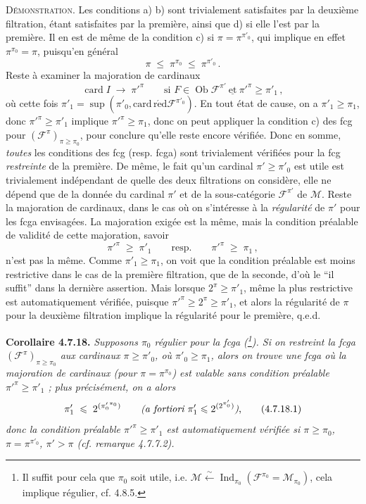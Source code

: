 \documentclass[11pt]{article}
\newcommand{\printedpage}[1]{\marginpar{\footnotesize p.~#1}}
\newcommand{\msp}[1]{\marginpar{\footnotesize [#1]}}
\newcommand{\Ob}{\operatorname{Ob}}
\newcommand{\Ind}{\operatorname{Ind}}
\newcommand{\card}{\operatorname{card}}
\newcommand{\cardred}{\operatorname{card\,r\acute{e}d}}
\begin{document}
\textsc{Démonstration}. Les conditions a) b) sont trivialement satisfaites par la deuxième filtration, étant satisfaites par la première, ainsi que d) si elle l'est par la première. Il en est de même de la condition c) si $\pi=\pi^{\pi'_0}$, qui implique en effet $\pi^{\pi_0}=\pi$, puisqu'en général
\[
\pi \;\leqslant\; \pi^{\pi_0} \;\leqslant\; \pi^{\pi'_0} \, .
\]
Reste à examiner la majoration de cardinaux
\[
\card I \;\longrightarrow\; \pi'^{\pi} \qquad \text{si } F\in\Ob\mathcal{F}^{\pi'} \ \underline{\text{et}}\ \pi'^{\pi}\geqslant\pi'_1 \, , %
\]
où cette fois $\pi'_1=\sup(\pi'_0,\cardred\mathcal{F}^{\pi'_0})$. En tout état de cause, on a $\pi'_1\geqslant\pi_1$, donc
\msp{page 183}
$\pi'^{\pi}\geqslant\pi'_1$ implique $\pi'^{\pi}\geqslant\pi_1$, donc on peut appliquer la condition c) des fcg pour $(\mathcal{F}^{\pi})_{\pi\geqslant\pi_0}$, pour conclure qu'elle reste encore vérifiée. Donc en somme, \textit{toutes} les conditions des fcg (resp. fcga) sont trivialement vérifiées pour la fcg \textit{restreinte} de la première. De même, le fait qu'un cardinal $\pi'\geqslant\pi'_0$ est utile est trivialement indépendant de quelle des deux filtrations on considère, elle ne dépend que de la donnée du cardinal $\pi'$ et de la sous-catégorie $\mathcal{F}^{\pi'}$ de $\mathcal{M}$. Reste la majoration de cardinaux, dans le cas où on s'intéresse à la \textit{régularité} de $\pi'$ pour les fcga envisagées. La majoration exigée est la même, mais la condition préalable de validité de cette majoration, savoir
\[
\pi'^{\pi} \;\geqslant\; \pi'_1 \qquad \text{resp.} \qquad \pi'^{\pi} \;\geqslant\; \pi_1 \, ,
\]
n'est pas la même. Comme $\pi'_1\geqslant\pi_1$, on voit que la condition préalable est moins restrictive dans le cas de la première filtration, que de la seconde, d'où le ``il suffit'' dans la dernière assertion. Mais lorsque $2^{\pi}\geqslant\pi'_1$, même la plus restrictive est automatique\msp{page 184}ment vérifiée, puisque $\pi'^{\pi}\geqslant 2^{\pi}\geqslant\pi'_1$, et alors la régularité de $\pi$ pour la deuxième filtration implique la régularité pour le première, q.e.d. %

\noindent\printedpage{63}
\textbf{Corollaire 4.7.18.} \textit{Supposons $\pi_0$ régulier pour la fcga (\footnote[77]{Il suffit pour cela que $\pi_0$ soit utile, i.e. $\mathcal{M}\xleftarrow{\ \sim\ }\Ind_{\pi_0}(\mathcal{F}^{\pi_0}=\mathcal{M}_{\pi_0})$, cela implique régulier, cf. 4.8.5.}). Si on restreint la fcga $(\mathcal{F}^{\pi})_{\pi\geqslant\pi_0}$ aux cardinaux $\pi\geqslant\pi'_0$, où $\pi'_0\geqslant\pi_1$, alors on trouve une fcga où la majoration de cardinaux (pour $\pi=\pi^{\pi_0}$) est valable sans condition préalable $\pi'^{\pi}\geqslant\pi'_1$ ; plus précisément, on a alors}
\[
\pi'_1 \;\leqslant\; 2^{({\pi'_0}^{\pi_0})} \qquad \text{\textit{(a fortiori $\pi'_1\leqslant 2^{(2^{\pi'_0})}$)},} \tag*{(4.7.18.1)}
\]
\textit{donc la condition préalable $\pi'^{\pi}\geqslant\pi'_1$ est automatiquement vérifiée si $\pi\geqslant\pi_0$, $\pi=\pi^{\pi'_0}$, $\pi'>\pi$ (cf. remarque 4.7.7.2).}
\end{document}
